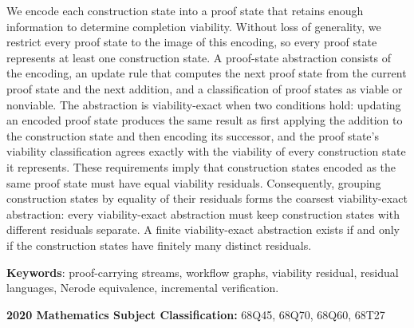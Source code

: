 \documentclass[a4paper,11pt,twoside,russian,english]{article}
\begin{document}
We encode each construction state into a proof state that retains enough information to determine completion viability. Without loss of generality, we restrict every proof state to the image of this encoding, so every proof state represents at least one construction state. A proof-state abstraction consists of the encoding, an update rule that computes the next proof state from the current proof state and the next addition, and a classification of proof states as viable or nonviable. The abstraction is viability-exact when two conditions hold: updating an encoded proof state produces the same result as first applying the addition to the construction state and then encoding its successor, and the proof state's viability classification agrees exactly with the viability of every construction state it represents. These requirements imply that construction states encoded as the same proof state must have equal viability residuals. Consequently, grouping construction states by equality of their residuals forms the coarsest viability-exact abstraction: every viability-exact abstraction must keep construction states with different residuals separate. A finite viability-exact abstraction exists if and only if the construction states have finitely many distinct residuals.


{\footnotesize

\medskip\noindent\textbf{Keywords}: proof-carrying streams, workflow graphs, viability residual, residual languages, Nerode equivalence, incremental verification.

\medskip\noindent\textbf{2020 Mathematics Subject Classification: }{68Q45, 68Q70, 68Q60, 68T27}
}
\end{document}
